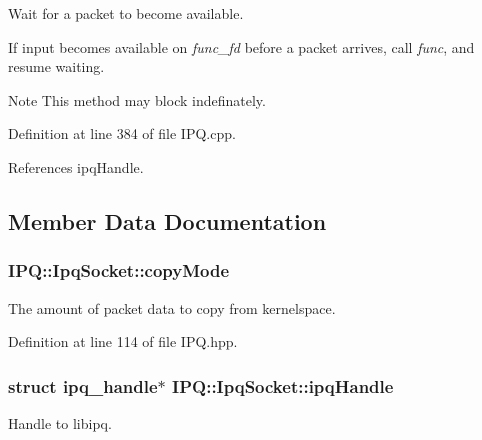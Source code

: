 \-Wait for a packet to become available. 

\-If input becomes available on {\itshape func\-\_\-fd\/} before a packet arrives, call {\itshape func\/}, and resume waiting. \begin{DoxyNote}{\-Note}
\-This method may block indefinately. 
\end{DoxyNote}


\-Definition at line 384 of file \-I\-P\-Q.\-cpp.



\-References ipq\-Handle.



\subsection{\-Member \-Data \-Documentation}
\hypertarget{classIPQ_1_1IpqSocket_adef58e75a6d67b6179ff73b59ff49eeb}{
\subsubsection[{copy\-Mode}]{ {\bf \-I\-P\-Q\-::\-Ipq\-Socket\-::copy\-Mode}}}
\label{classIPQ_1_1IpqSocket_adef58e75a6d67b6179ff73b59ff49eeb}


\-The amount of packet data to copy from kernelspace. 



\-Definition at line 114 of file \-I\-P\-Q.\-hpp.

\hypertarget{classIPQ_1_1IpqSocket_ad4d1b18fe03e035fb76f6bcd6eaa32cb}{
\subsubsection[{ipq\-Handle}]{\setlength{\rightskip}{0pt plus 5cm}struct ipq\-\_\-handle$\ast$ {\bf \-I\-P\-Q\-::\-Ipq\-Socket\-::ipq\-Handle}}}
\label{classIPQ_1_1IpqSocket_ad4d1b18fe03e035fb76f6bcd6eaa32cb}


\-Handle to libipq. 



